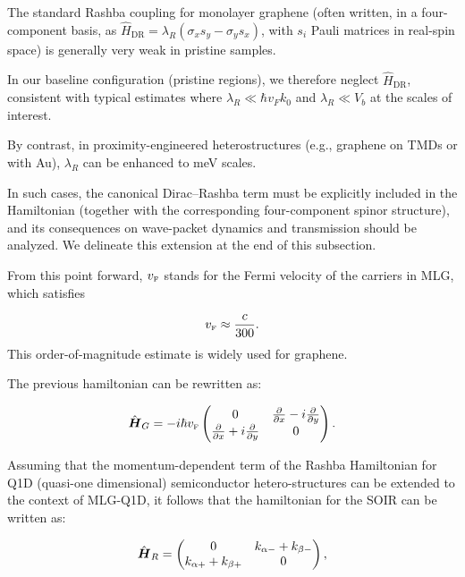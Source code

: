 The standard Rashba coupling for monolayer graphene (often written, in a four-component basis, as $\hat{H}_{\mathrm{DR}}=\lambda_R(\sigma_x s_y-\sigma_y s_x)$, with $s_i$ Pauli matrices in real-spin space) is generally very weak in pristine samples.

In our baseline configuration (pristine regions), we therefore neglect $\hat{H}_{\mathrm{DR}}$, consistent with typical estimates where $\lambda_R \ll \hbar v_F k_0$ and $\lambda_R \ll V_b$ at the scales of interest.

By contrast, in proximity-engineered heterostructures (e.g., graphene on TMDs or with Au), $\lambda_R$ can be enhanced to meV scales\cite{AvsarNatCommun2014, WangPhysRevX2016}.

In such cases, the canonical Dirac--Rashba term must be explicitly included in the Hamiltonian (together with the corresponding four-component spinor structure), and its consequences on wave-packet dynamics and transmission should be analyzed. We delineate this extension at the end of this subsection.


From this point forward, $v_{\mbox{\tiny F}}$ stands for the Fermi velocity of the carriers in MLG, which satisfies

\begin{equation}
    \label{eq:vF}
    v_{\mbox{\tiny F}} \approx \frac{c}{300}.
\end{equation}
This order-of-magnitude estimate is widely used for graphene\cite{Geimk2007}.

The previous hamiltonian can be rewritten as:

\begin{equation}
    \label{eq:pristineGrapheneMatrix}
    \hat{\mbox{\boldmath $H$}}_G = -i\hbar v_{\mbox{\tiny F}}
    \begin{pmatrix}
        0                                                         & \frac{\partial}{\partial x}- i\frac{\partial}{\partial y} \\
        \frac{\partial}{\partial x}+ i\frac{\partial}{\partial y} & 0
    \end{pmatrix}.
\end{equation}

Assuming that the momentum-dependent term of the Rashba Hamiltonian for Q1D (quasi-one dimensional) semiconductor hetero-structures can be extended to the context of MLG-Q1D\cite{RDiago2010, Serna2019, RCDiagoEPL2015}, it follows that the hamiltonian for the SOIR can be written as:

\begin{equation}
    \label{eq:SOIRHamiltonian}
    \hat{\mbox{\boldmath $H$}}_R =
    \begin{pmatrix}
        0                        & k_{\alpha-} + k_{\beta-} \\
        k_{\alpha+} + k_{\beta+} & 0
    \end{pmatrix},
\end{equation}

